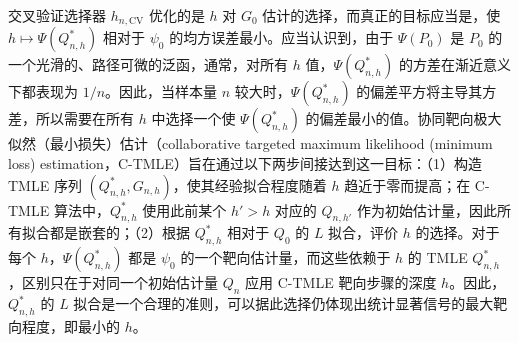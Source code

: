 交叉验证选择器 $h_{n,\mathrm{CV}}$ 优化的是 $h$ 对 $G_0$ 估计的选择，而真正的目标应当是，使 $h\mapsto\Psi(Q_{n,h}^*)$ 相对于 $\psi_0$ 的均方误差最小。应当认识到，由于 $\Psi(P_0)$ 是 $P_0$ 的一个光滑的、路径可微的泛函，通常，对所有 $h$ 值，$\Psi(Q_{n,h}^*)$ 的方差在渐近意义下都表现为 $1/n$。因此，当样本量 $n$ 较大时，$\Psi(Q_{n,h}^*)$ 的偏差平方将主导其方差，所以需要在所有 $h$ 中选择一个使 $\Psi(Q_{n,h}^*)$ 的偏差最小的值。协同靶向极大似然（最小损失）估计（collaborative targeted maximum likelihood (minimum loss) estimation，C-TMLE）旨在通过以下两步间接达到这一目标：（1）构造 TMLE 序列 $(Q_{n,h}^*,G_{n,h})$，使其经验拟合程度随着 $h$ 趋近于零而提高；在 C-TMLE 算法中，$Q_{n,h}^*$ 使用此前某个 $h'>h$ 对应的 $Q_{n,h'}$ 作为初始估计量，因此所有拟合都是嵌套的；（2）根据 $Q_{n,h}^*$ 相对于 $Q_0$ 的 $L$ 拟合，评价 $h$ 的选择。对于每个 $h$，$\Psi(Q_{n,h}^*)$ 都是 $\psi_0$ 的一个靶向估计量，而这些依赖于 $h$ 的 TMLE $Q_{n,h}^*$，区别只在于对同一个初始估计量 $Q_n$ 应用 C-TMLE 靶向步骤的深度 $h$。因此，$Q_{n,h}^*$ 的 $L$ 拟合是一个合理的准则，可以据此选择仍体现出统计显著信号的最大靶向程度，即最小的 $h$。

